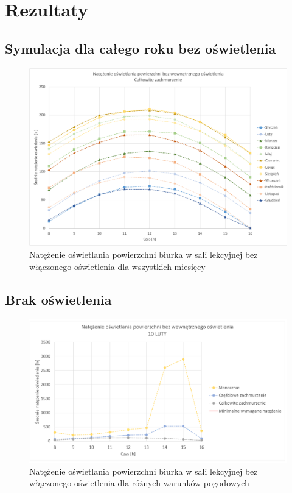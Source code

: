 \documentclass[a4paper,12pt]{article}
\begin{document}
	\section{Rezultaty}
	\label{sec:rezultaty}
	
	\subsection{Symulacja dla całego roku bez oświetlenia}
	\label{sec:cały_rok}
	
	\begin{figure}[ht!]
		\includegraphics[scale=0.8]{Wykresy/caly_rok.pdf}
		\centering
		\caption{Natężenie oświetlania powierzchni biurka w sali lekcyjnej bez włączonego oświetlenia dla wszystkich miesięcy}
		\label{fig:caly_rok}
	\end{figure}
	
	\subsection{Brak oświetlenia}
	\label{sec:brak_oswietlenia}
	
	\begin{figure}[ht!]
		\centering
		\includegraphics[scale=0.8]{Wykresy/bez_oswietlenia_1.pdf}
		\caption{Natężenie oświetlania powierzchni biurka w sali lekcyjnej bez włączonego oświetlenia dla różnych warunków pogodowych }
		\label{bez_oswietlenia_1}
	\end{figure}
\end{document}
